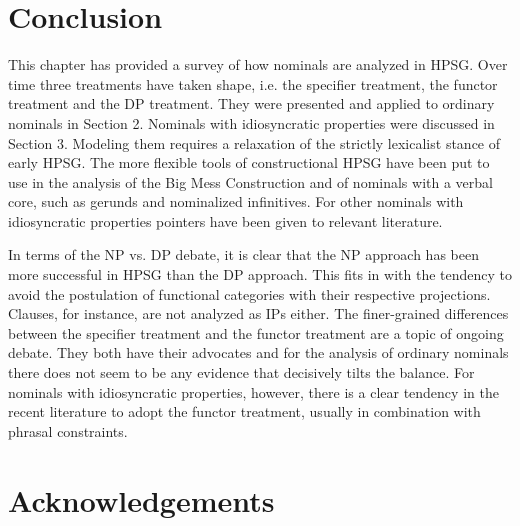 \documentclass[output=paper]{langsci/langscibook}
\begin{document}
\section{Conclusion} 


This chapter has provided a survey of how nominals are analyzed in HPSG. 
Over time three treatments have taken shape, i.e. the specifier treatment, 
the functor treatment and the DP treatment. They were presented and applied to ordinary 
nominals in Section 2. Nominals with idiosyncratic properties were discussed in Section 3.
Modeling them requires a relaxation of the strictly lexicalist stance of early HPSG.  
The more flexible tools of constructional HPSG have been put to use in the analysis 
of the Big Mess Construction and of nominals with a verbal core, such as gerunds and 
nominalized infinitives. For other nominals with idiosyncratic properties pointers 
have been given to relevant literature. 

In terms of the NP vs. DP debate, it is clear that the NP approach has been 
more successful in HPSG than the DP approach. This fits in with the tendency to 
avoid the postulation of functional categories with their respective projections. 
Clauses, for instance, are not analyzed as IPs either. The finer-grained 
differences between the specifier treatment and the functor treatment are 
a topic of ongoing debate. They both have their advocates and for the analysis of 
ordinary nominals there does not seem to be any evidence that decisively tilts the balance. 
For nominals with idiosyncratic properties, however, there is a clear tendency in the recent 
literature to adopt the functor treatment, usually in combination with phrasal constraints.    


 
\section*{Acknowledgements}

{\sloppy
\printbibliography[heading=subbibliography,notkeyword=this] 
}
\end{document}
